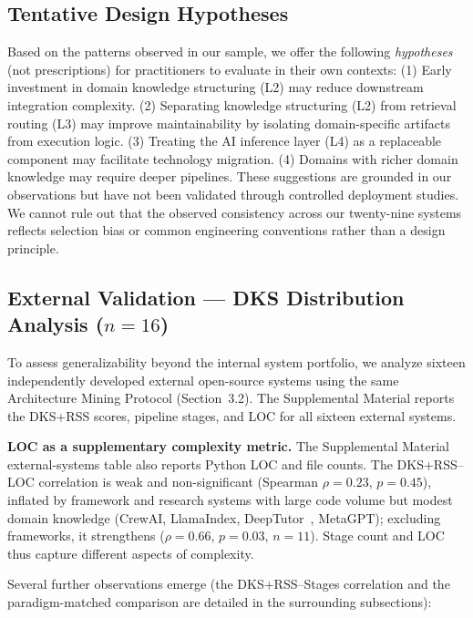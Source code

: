 \documentclass[fleqn,10pt,lineno]{wlpeerj}
\begin{document}
\subsection{Tentative Design Hypotheses}

Based on the patterns observed in our sample, we offer the following \textit{hypotheses} (not prescriptions) for practitioners to evaluate in their own contexts: (1) Early investment in domain knowledge structuring (L2) may reduce downstream integration complexity. (2) Separating knowledge structuring (L2) from retrieval routing (L3) may improve maintainability by isolating domain-specific artifacts from execution logic. (3) Treating the AI inference layer (L4) as a replaceable component may facilitate technology migration. (4) Domains with richer domain knowledge may require deeper pipelines. These suggestions are grounded in our observations but have not been validated through controlled deployment studies. We cannot rule out that the observed consistency across our twenty-nine systems reflects selection bias or common engineering conventions rather than a design principle.

\subsection{External Validation --- DKS Distribution Analysis \texorpdfstring{($n=16$)}{(n=16)}}
\label{sec:external_validation}

To assess generalizability beyond the internal system portfolio, we analyze sixteen independently developed external open-source systems using the same Architecture Mining Protocol (Section~3.2). The Supplemental Material reports the DKS+RSS scores, pipeline stages, and LOC for all sixteen external systems.

\textbf{LOC as a supplementary complexity metric.} The Supplemental Material external-systems table also reports Python LOC and file counts. The DKS+RSS--LOC correlation is weak and non-significant (Spearman $\rho = 0.23$, $p = 0.45$), inflated by framework and research systems with large code volume but modest domain knowledge (CrewAI, LlamaIndex, DeepTutor~\citep{deeptutor}, MetaGPT); excluding frameworks, it strengthens ($\rho = 0.66$, $p = 0.03$, $n = 11$). Stage count and LOC thus capture different aspects of complexity.

Several further observations emerge (the DKS+RSS--Stages correlation and the paradigm-matched comparison are detailed in the surrounding subsections):
\end{document}
